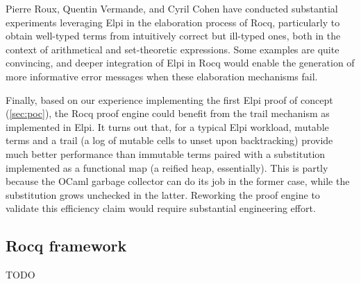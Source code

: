 \documentclass[a4paper, 11pt]{book}
\begin{document}
Pierre Roux, Quentin Vermande, and Cyril Cohen have conducted substantial
experiments leveraging Elpi in the elaboration process of Rocq, particularly to
obtain well-typed terms from intuitively correct but ill-typed ones, both in
the context of arithmetical and set-theoretic expressions. Some examples are
quite convincing, and deeper integration of Elpi in Rocq would enable the
generation of more informative error messages when these elaboration mechanisms
fail.

Finally, based on our experience implementing the first Elpi proof of
concept (\cref{sec:poc}), the Rocq proof engine could benefit from the trail
mechanism as implemented in Elpi. It turns out that, for a typical Elpi
workload, mutable terms and a trail (a log of mutable cells to unset upon
backtracking) provide much better performance than immutable terms paired with
a substitution implemented as a functional map (a reified heap, essentially).
This is partly because the OCaml garbage collector can do its job in the former
case, while the substitution grows unchecked in the latter. Reworking the proof
engine to validate this efficiency claim would require substantial engineering
effort.

\subsection{Rocq framework}

TODO

\printindex[concept]
\printbibliography[title={Our Bibliography}, keyword=me]
\printbibliography[title={Bibliography}, keyword=they]
\end{document}
